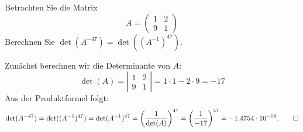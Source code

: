 Betrachten Sie die Matrix
\[
A=\begin{pmatrix}
1&2\\
9&1
\end{pmatrix}
\]
Berechnen Sie $\det(A^{-47}) = \det((A^{-1})^{47})$.


\begin{loesung}
Zunächst berechnen wir die Determinante von $A$:
\[
\det(A)=
\left|
\begin{matrix}
1&2\\
9&1
\end{matrix}
\right|
=1\cdot 1 - 2 \cdot 9 = -17
\]
Aus der Produktformel folgt:
\[
\det(A^{-47}) 
= 
\det((A^{-1})^{47})
=
\det(A^{-1})^{47}
=
\left(\dfrac{1}{\det(A)}\right)^{47}
=
\left(\dfrac{1}{-17}\right)^{47}
=
-1.4754\cdot 10^{-58}.
\qedhere
\]
\end{loesung}




